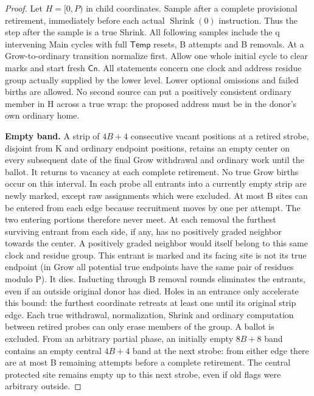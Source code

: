 \begin{proof}
Let \(H=[0,P)\) in child coordinates. Sample after a complete provisional retirement, immediately before each actual \(\operatorname{Shrink}(0)\) instruction. Thus the step after the sample is a true Shrink. All following samples include the q intervening Main cycles with full \(\mathsf{Temp}\) resets, B attempts and B removals. At a Grow-to-ordinary transition normalize first. Allow one whole initial cycle to clear marks and start fresh \(\mathsf{Cn}\). All statements concern one clock and address residue group actually supplied by the lower level. Lower optional omissions and failed births are allowed. No second source can put a positively consistent ordinary member in H across a true wrap: the proposed address must be in the donor's own ordinary home.

\textbf{Empty band.} A strip of \(4B+4\) consecutive vacant positions at a retired strobe, disjoint from K and ordinary endpoint positions, retains an empty center on every subsequent date of the final Grow withdrawal and ordinary work until the ballot. It returns to vacancy at each complete retirement. No true Grow births occur on this interval. In each probe all entrants into a currently empty strip are newly marked, except raw assignments which were excluded. At most B sites can be entered from each edge because recruitment moves by one per attempt. The two entering portions therefore never meet. At each removal the furthest surviving entrant from each side, if any, has no positively graded neighbor towards the center. A positively graded neighbor would itself belong to this same clock and residue group. This entrant is marked and its facing site is not its true endpoint (in Grow all potential true endpoints have the same pair of residues modulo P). It dies. Inducting through B removal rounds eliminates the entrants, even if an outside original donor has died. Holes in an entrance only accelerate this bound: the furthest coordinate retreats at least one until its original strip edge. Each true withdrawal, normalization, Shrink and ordinary computation between retired probes can only erase members of the group. A ballot is excluded. From an arbitrary partial phase, an initially empty \(8B+8\) band contains an empty central \(4B+4\) band at the next strobe: from either edge there are at most B remaining attempts before a complete retirement. The central protected site remains empty up to this next strobe, even if old flags were arbitrary outside.


\end{proof}
